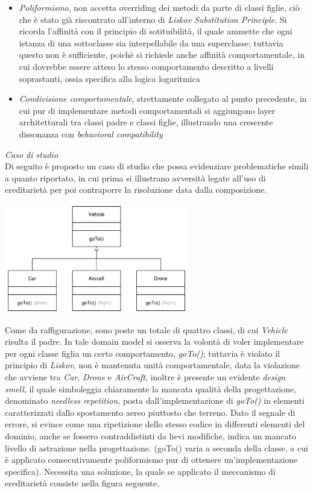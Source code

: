 \documentclass{article}
\begin{document}
\begin{itemize}[label={-}]
    \itemsep0em
    \item \textit{Poliformismo}, non accetta overriding dei metodi da parte di classi figlie, ciò che è stato già riscontrato all'interno di \textit{Liskov Substitution Principle}. Si ricorda l'affinità con il principio di sotituibilità, il quale ammette che ogni istanza di una sottoclasse sia interpellabile da una superclasse; tuttavia questo non è sufficiente, poichè si richiede anche affinità comportamentale, in cui dovrebbe essere atteso lo stesso comportamento descritto a livelli soprastanti, ossia specifica alla logica logaritmica
    \item \textit{Condivisione comportamentale}, strettamente collegato al punto precedente, in cui pur di implementare metodi comportamentali si aggiungono layer architetturali tra classi padre e classi figlie, illustrando una crescente dissonanza con \textit{behavioral compatibility}
\end{itemize}\vspace*{7pt}
\textit{Caso di studio}\\
Di seguito è proposto un caso di studio che possa evidenziare problematiche simili a quanto riportato, in cui prima si illustrano avversità legate all'uso di ereditarietà per poi contraporre la risoluzione data dalla composizione.\vspace*{7pt}
\begin{center}
    \includegraphics*[width=0.6\textwidth]{foto 1.png}
\end{center}
Come da raffigurazione, sono poste un totale di quattro classi, di cui \textit{Vehicle} risulta il padre. In tale domain model si osserva la volontà di voler implementare per ogni classe figlia un certo comportamento, \textit{goTo()}; tuttavia è violato il principio di \textit{Liskov}, non è mantenuta unità comportamentale, data la violazione che avviene tra \textit{Car}, \textit{Drone} e \textit{AirCraft}, inoltre è presente un evidente \textit{design smell}, il quale simboleggia chiaramente la mancata qualità della progettazione, denominato \textit{needless repetition}, posta dall'implementazione di \textit{goTo()} in elementi caratterizzati dallo spostamento aereo piuttosto che terreno. Dato il segnale di errore, si evince come una ripetizione dello stesso codice in differenti elementi del dominio, anche se fossero contraddistinti da lievi modifiche, indica un mancato livello di astrazione nella progettazione. (goTo() varia a seconda della classe, a cui è applicato consecutivamente poliformismo pur di ottenere un'implementazione specifica). Necessita una soluzione, la quale se applicato il meccanismo di ereditarietà consiste nella figura seguente.\vspace*{7pt}
\end{document}
